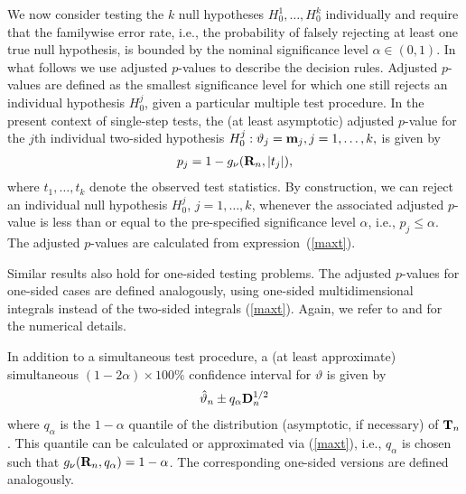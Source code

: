 \documentclass[12pt,a4paper]{article}
\begin{document}
We now consider testing the $k$ null hypotheses $H_0^1, \ldots, H_0^k$
individually and require that the familywise error rate, i.e., the
probability of falsely rejecting at least one true null hypothesis, is
bounded by the nominal significance level $\alpha \in (0, 1)$. In what
follows we use adjusted $p$-values to describe the decision rules. Adjusted $%
p$-values are defined as the smallest significance level for which one still
rejects an individual hypothesis $H_0^j$, given a particular multiple test
procedure. In the present context of single-step tests, 
the (at least asymptotic) adjusted $p$-value for the $j$th
individual two-sided hypothesis $H_0^j: \vartheta_j = \mathbf{m}_j, j = 1,
\dots, k, $ is given by 
\begin{eqnarray*}
p_j = 1 - g_\nu(\mathbf{R}_n, |t_j|),
\end{eqnarray*}
where $t_1, \dots, t_k$ denote the observed test statistics. By
construction, we can reject an individual null hypothesis $H_0^j$, $j= 1,
\ldots, k$, whenever the associated adjusted $p$-value is less than or equal
to the pre-specified significance level $\alpha$, i.e., $p_j \leq \alpha$.
The adjusted $p$-values are calculated from expression~(\ref{maxt}).

Similar results also hold for one-sided testing problems. The adjusted 
$p$-values for one-sided cases are defined
analogously, using one-sided multidimensional integrals instead of the
two-sided integrals (\ref{maxt}). 
Again, we refer to \cite{Genz1992,GenzBretz1999,BretzGenzHothorn2001} and 
\cite{GenzBretz2002} for the numerical details.


In addition to a simultaneous test procedure, a (at least approximate) 
simultaneous $(1 - 2\alpha)
\times 100\%$ confidence interval for $\vartheta$ is given by 
\begin{eqnarray*}
\hat{\vartheta}_n \pm q_\alpha \mathbf{D}_n^{1/2}
\end{eqnarray*}
where $q_\alpha$ is the $1 - \alpha$ quantile of the distribution
(asymptotic, if necessary) of $\mathbf{T}_n$.
This quantile can be calculated or approximated via (\ref{maxt}), i.e.,
$q_\alpha$ is chosen such that $g_\nu(\mathbf{R}_n, q_\alpha) = 1 - \alpha$. 
The corresponding one-sided versions are defined analogously.
\end{document}
